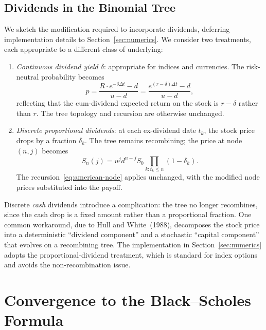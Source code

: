 \documentclass[11pt,a4paper]{article}
\theoremstyle{plain}
\theoremstyle{definition}
\begin{document}
\subsection{Dividends in the Binomial Tree}
\label{subsec:dividends}

We sketch the modification required to incorporate dividends, deferring
implementation details to Section~\ref{sec:numerics}. We consider two
treatments, each appropriate to a different class of underlying:

\begin{enumerate}
    \item \emph{Continuous dividend yield $\delta$}: appropriate for
    indices and currencies. The risk-neutral probability becomes
    \[
    p = \frac{R \cdot e^{-\delta \Delta t} - d}{u - d}
        = \frac{e^{(r - \delta)\Delta t} - d}{u - d},
    \]
    reflecting that the cum-dividend expected return on the stock is
    $r - \delta$ rather than $r$. The tree topology and recursion are
    otherwise unchanged.

    \item \emph{Discrete proportional dividends}: at each ex-dividend
    date $t_k$, the stock price drops by a fraction $\delta_k$. The
    tree remains recombining; the price at node $(n, j)$ becomes
    \[
    S_n(j) = u^j d^{n-j} S_0 \prod_{k : t_k \leq n} (1 - \delta_k).
    \]
    The recursion~\eqref{eq:american-node} applies unchanged, with the
    modified node prices substituted into the payoff.
\end{enumerate}

Discrete \emph{cash} dividends introduce a complication: the tree no
longer recombines, since the cash drop is a fixed amount rather than a
proportional fraction. One common workaround, due to Hull and
White~(1988), decomposes the stock price into a deterministic
``dividend component'' and a stochastic ``capital component'' that
evolves on a recombining tree. The implementation in
Section~\ref{sec:numerics} adopts the proportional-dividend treatment,
which is standard for index options and avoids the non-recombination
issue.

\section{Convergence to the Black--Scholes Formula}
\label{sec:convergence}
\end{document}
